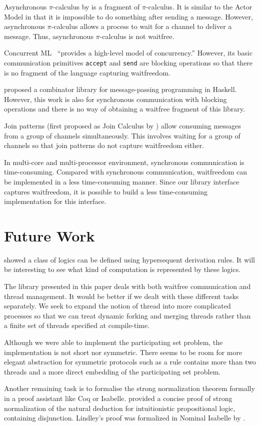 Asynchronous $\pi$-calculus by \citet{api} is a fragment of
$\pi$-calculus.  It is
similar to the Actor Model in that it is impossible to do something
after sending a message.  However, asynchronous $\pi$-calculus
allows a process to wait for a channel to deliver a message.  Thus,
asynchronous $\pi$-calculus is not waitfree.

Concurrent ML~\citep{concurrentML} ``provides a high-level model of
concurrency.''  However, its basic communication primitives
\texttt{accept} and \texttt{send} are blocking operations so that there
is no fragment of the language capturing waitfreedom.

\citet{Brown} proposed a combinator library for message-passing
programming in Haskell.  However, this work is also for synchronous
communication with blocking operations and there is no way of
obtaining a waitfree
fragment of this library.

Join patterns (first proposed as Join Calculus by \citet{join}) allow
consuming messages from a group of
channels simultaneously.  This involves waiting for a group of channels
so that join patterns do not capture waitfreedom either.

In multi-core and multi-processor environment, synchronous communication
is time-consuming.  Compared with
synchronous communication, waitfreedom can be implemented in a less
time-consuming manner.  Since our library
interface captures waitfreedom, it is possible to build a less
time-consuming implementation for this interface.



\section{Future Work}

\citet*{alg} showed a class of logics can be defined using
hypersequent derivation rules.  It will be interesting to see what kind
of computation is represented by these logics.

The library presented in this paper deals with both waitfree
communication and thread management.  It would be better if we dealt with
these different tasks separately.
 We seek to expand the notion of thread into more complicated
 processes so that we can treat dynamic
 forking and merging threads rather
 than a finite set of threads specified at compile-time.

Although we were able to implement the participating set problem,
the implementation is not short nor symmetric.
There seems to be room for more elegant abstraction for symmetric
protocols such as
a rule contains more than two threads and a more direct embedding of the
participating set problem.

Another remaining task is to formalise the strong normalization theorem
formally in a proof assistant like Coq or Isabelle.
\citet{ttlifting} provided a concise proof of strong normalization of
the natural deduction for
intuitionistic propositional logic, containing disjunction.
Lindley's proof was formalized in Nominal Isabelle by
\citet{Doczkal2009}.
